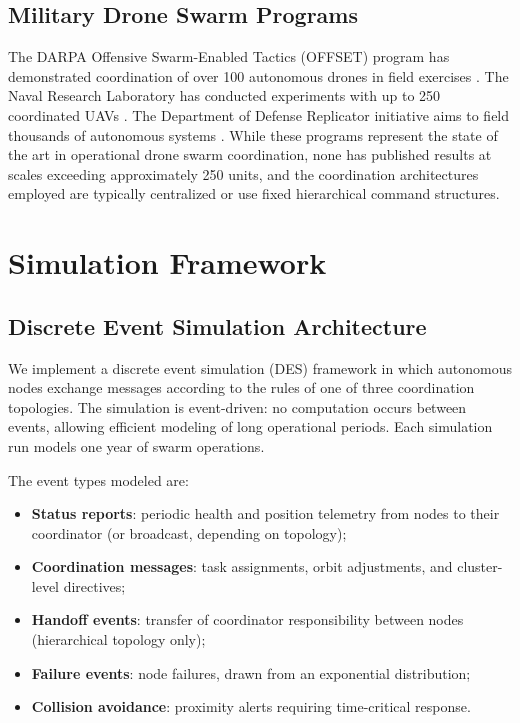 \documentclass[journal]{IEEEtran}
\begin{document}
\subsection{Military Drone Swarm Programs}

The DARPA Offensive Swarm-Enabled Tactics (OFFSET) program has demonstrated coordination of over 100 autonomous drones in field exercises \cite{darpa_offset}. The Naval Research Laboratory has conducted experiments with up to 250 coordinated UAVs \cite{nrl_swarm}. The Department of Defense Replicator initiative aims to field thousands of autonomous systems \cite{dod_replicator}. While these programs represent the state of the art in operational drone swarm coordination, none has published results at scales exceeding approximately 250 units, and the coordination architectures employed are typically centralized or use fixed hierarchical command structures.


\section{Simulation Framework}

\subsection{Discrete Event Simulation Architecture}

We implement a discrete event simulation (DES) framework in which autonomous nodes exchange messages according to the rules of one of three coordination topologies. The simulation is event-driven: no computation occurs between events, allowing efficient modeling of long operational periods. Each simulation run models one year of swarm operations.

The event types modeled are:
\begin{itemize}
    \item \textbf{Status reports}: periodic health and position telemetry from nodes to their coordinator (or broadcast, depending on topology);
    \item \textbf{Coordination messages}: task assignments, orbit adjustments, and cluster-level directives;
    \item \textbf{Handoff events}: transfer of coordinator responsibility between nodes (hierarchical topology only);
    \item \textbf{Failure events}: node failures, drawn from an exponential distribution;
    \item \textbf{Collision avoidance}: proximity alerts requiring time-critical response.
\end{itemize}
\end{document}
